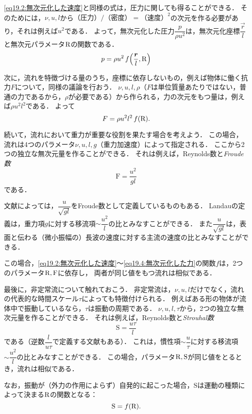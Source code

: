 \eqref{eq19.2:無次元化した速度}と同様の式は，圧力に関しても得ることができる．
そのためには，$\nu,u,l$から$\text{（圧力）}/\text{（密度）}=\text{（速度）}^2$の次元を作る必要があり，それは例えば$u^2$である．
よって，無次元化した圧力$\dfrac{p}{\rho u^2}$は，無次元化座標$\dfrac{\vec{r}}{l}$と無次元パラメータ$\mathrm{R}$の関数である．
\begin{equation}\label{eq19.3:無次元化した圧力}
    p = \rho u^2 \, f\pqty{ \frac{\vec{r}}{l}, \R }
\end{equation}


次に，流れを特徴づける量のうち，座標に依存しないもの，例えば物体に働く抗力$F$について，同様の議論を行おう．
$\nu,u,l,\rho$（$F$は単位質量あたりではない，普通の力であるから，$\rho$が必要である）から作られる，力の次元をもつ量は，例えば$\rho u^2l^2$である．
よって
\begin{equation}\label{eq19.4:無次元化した力}
    F = \rho u^2 l^2 \, f(\mathrm{R}) .
\end{equation}



続いて，流れにおいて重力が重要な役割を果たす場合を考えよう．
この場合，流れは4つのパラメータ$\nu,u,l,g$（重力加速度）によって指定される．
ここから2つの独立な無次元量を作ることができる．
それは例えば，Reynolds数と\emph{Froude数}
\begin{equation}
    \mathrm{F} = \frac{u^2}{gl}
\end{equation}
である．
%
%
\begin{details}
文献によっては，$\dfrac{u}{\sqrt{gl}}$をFroude数として定義しているものもある．
Landauの定義は，重力項$g$に対する移流項$\sim \dfrac{u^2}{l}$の比とみなすことができる．
また$\dfrac{u}{\sqrt{gl}}$は，表面と伝わる（微小振幅の）長波の速度に対する主流の速度の比とみなすことができる．
\end{details}
\noindent
この場合，\eqref{eq19.2:無次元化した速度}〜\eqref{eq19.4:無次元化した力}の関数$f$は，2つのパラメータ$\mathrm{R}, \mathrm{F}$に依存し，
両者が同じ値をもつ流れは相似である．



最後に，非定常流について触れておこう．
非定常流は，$\nu,u,l$だけでなく，流れの代表的な時間スケール$\tau$によっても特徴付けられる．
例えばある形の物体が流体中で振動しているなら，$\tau$は振動の周期である．
$\nu,u,l,\tau$から，2つの独立な無次元量を作ることができる．
それは例えば，Reynolds数と\emph{Strouhal数}
\begin{equation}
    \mathrm{S} = \frac{u\tau}{l}
\end{equation}
である（逆数$\dfrac{l}{u\tau}$で定義する文献もある）．
これは，慣性項$\sim \dfrac{u}{\tau}$に対する移流項$\sim \dfrac{u^2}{l}$の比とみなすことができる．
この場合，パラメータ$\mathrm{R},\mathrm{S}$が同じ値をとるとき，流れは相似である．

なお，振動が（外力の作用によらず）自発的に起こった場合，$\mathrm{S}$は運動の種類によって決まる$\mathrm{R}$の関数となる：
\[
    \mathrm{S} = f(\mathrm{R}) .
\]



\BackToTheToc